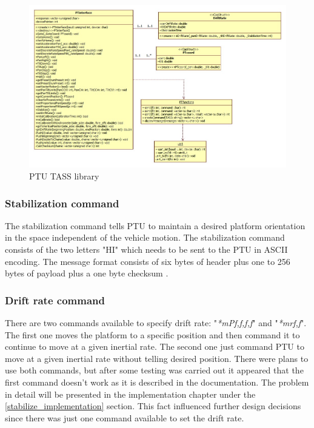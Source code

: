 \begin{figure}[H]
\centering
\centerline{\includegraphics[scale=0.53]{./images/PTinterface}}
\caption{PTU TASS library}
\label{fig:PTinterface}
\end{figure}

\subsubsection{Stabilization command}
The stabilization command tells PTU to maintain a desired platform orientation in the space independent of the vehicle motion. The stabilization command consists of the two letters "HI" which needs to be sent to the PTU in ASCII encoding. The message format consists of six bytes of header plus one to 256 bytes of payload plus a one byte checksum \cite{PTUCommandSetDocumentation}.    
\subsubsection{Drift rate command}
There are two commands available to specify drift rate: "\textit{*mPf,f,f,f}" and "\textit{*mrf,f}". The first one moves the platform to a specific position and then command it to continue to move at a given inertial rate. The second one just command PTU to move at a given inertial rate without telling desired position. There were plans to use both commands, but after some testing was carried out it appeared that the first command doesn't work as it is described in the documentation. The problem in detail will be presented in the implementation chapter under the \ref{stabilize_implementation} section. This fact influenced further design decisions since there was just one command available to set the drift rate. 

